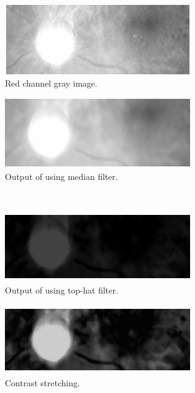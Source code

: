 \documentclass[12pt]{report}
\begin{document}
\begin{figure}[h]
\centering
\begin{subfigure}{.5\textwidth}
  \centering
  \includegraphics[width = 8cm, height =3cm]{Capture3}
  \caption{Red channel gray image.}
  \label{fig:sub1}
\end{subfigure}%
\begin{subfigure}{.5\textwidth}
  \centering
  \includegraphics[width = 8cm, height =3cm]{Capture4}
  \caption{Output of using median filter.}
  \label{fig:sub2}
\end{subfigure}
\\
\begin{subfigure}{.5\textwidth}
  \centering
  \includegraphics[width = 8cm, height =3cm]{Capture5}
  \caption{Output of using top-hat filter.}
  \label{fig:sub3}
\end{subfigure}%
\begin{subfigure}{.5\textwidth}
  \centering
  \includegraphics[width = 8cm, height =3cm]{Capture6}
  \caption{Contrast stretching.}
  \label{fig:sub4}
\end{subfigure}
\\
\begin{subfigure}{.5\textwidth}
  \centering

\end{subfigure}
\end{figure}
\end{document}
